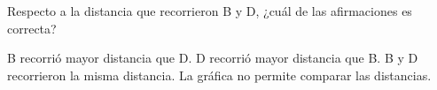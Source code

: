 Respecto a la distancia que recorrieron B y D, ¿cuál de las afirmaciones es correcta?

\begin{choices}
    \choice B recorrió mayor distancia que D.
    \choice D recorrió mayor distancia que B.
    \CorrectChoice B y D recorrieron la misma distancia.
    \choice La gráfica no permite comparar las distancias.
\end{choices}
